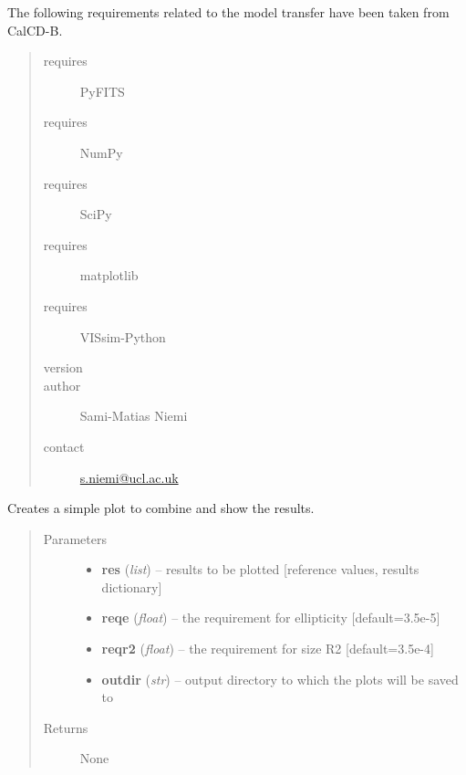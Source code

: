 \documentclass[a4paper,11pt,english]{sphinxmanual}
\begin{document}
The following requirements related to the model transfer have been taken from CalCD-B.
\begin{quote}\begin{description}
\item[{requires}] \leavevmode
PyFITS

\item[{requires}] \leavevmode
NumPy

\item[{requires}] \leavevmode
SciPy

\item[{requires}] \leavevmode
matplotlib

\item[{requires}] \leavevmode
VISsim-Python

\item[{version}] 

\item[{author}] \leavevmode
Sami-Matias Niemi

\item[{contact}] \leavevmode
\href{mailto:s.niemi@ucl.ac.uk}{s.niemi@ucl.ac.uk}

\end{description}\end{quote}

\begin{fulllineitems}
\label{reduction:analysis.nonlinearityModelTransfer.plotResults}
Creates a simple plot to combine and show the results.
\begin{quote}\begin{description}
\item[{Parameters}] \leavevmode\begin{itemize}
\item {} 
\textbf{res} (\emph{list}) -- results to be plotted {[}reference values, results dictionary{]}

\item {} 
\textbf{reqe} (\emph{float}) -- the requirement for ellipticity {[}default=3.5e-5{]}

\item {} 
\textbf{reqr2} (\emph{float}) -- the requirement for size R2 {[}default=3.5e-4{]}

\item {} 
\textbf{outdir} (\emph{str}) -- output directory to which the plots will be saved to

\end{itemize}

\item[{Returns}] \leavevmode
None

\end{description}\end{quote}

\end{fulllineitems}
\end{document}
